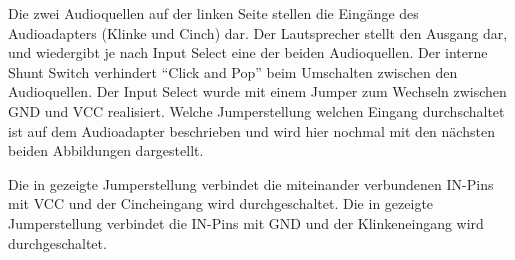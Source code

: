 

Die zwei Audioquellen auf der linken Seite stellen die Eingänge des Audioadapters (Klinke und Cinch) dar. Der Lautsprecher stellt den Ausgang dar, und wiedergibt je nach Input Select eine der beiden Audioquellen. Der interne Shunt Switch verhindert \enquote{Click and Pop} beim Umschalten zwischen den Audioquellen. Der Input Select wurde mit einem Jumper zum Wechseln zwischen GND und VCC realisiert. Welche Jumperstellung welchen Eingang durchschaltet ist auf dem Audioadapter beschrieben und wird hier nochmal mit den nächsten beiden Abbildungen dargestellt.

Die in  gezeigte Jumperstellung verbindet die miteinander verbundenen IN-Pins mit VCC und der Cincheingang wird durchgeschaltet.
Die in  gezeigte Jumperstellung verbindet die IN-Pins mit GND und der Klinkeneingang wird durchgeschaltet.

